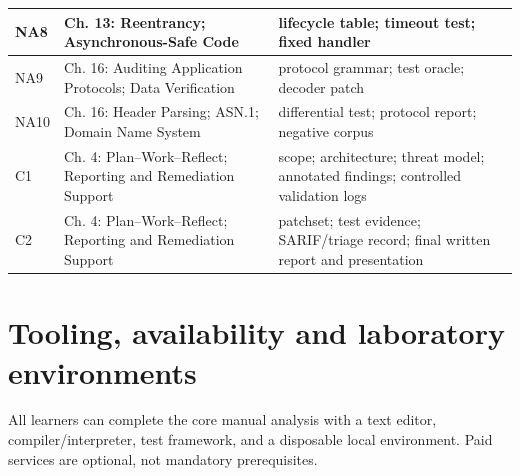 \documentclass[10pt,letterpaper]{article}
\begin{document}
\begin{longtable}{>{\raggedright\arraybackslash}p{}>{\raggedright\arraybackslash}p{}>{\raggedright\arraybackslash}p{}}
NA8 & Ch. 13: Reentrancy; Asynchronous-Safe Code & lifecycle table; timeout test; fixed handler\\\midrule
NA9 & Ch. 16: Auditing Application Protocols; Data Verification & protocol grammar; test oracle; decoder patch\\\midrule
NA10 & Ch. 16: Header Parsing; ASN.1; Domain Name System & differential test; protocol report; negative corpus\\\midrule
C1 & Ch. 4: Plan--Work--Reflect; Reporting and Remediation Support & scope; architecture; threat model; annotated findings; controlled validation logs\\\midrule
C2 & Ch. 4: Plan--Work--Reflect; Reporting and Remediation Support & patchset; test evidence; SARIF/triage record; final written report and presentation\\\midrule
\bottomrule\end{longtable}\endgroup
\section{Tooling, availability and laboratory environments}
All learners can complete the core manual analysis with a text editor, compiler/interpreter, test framework, and a disposable local environment. Paid services are optional, not mandatory prerequisites.
\end{document}
